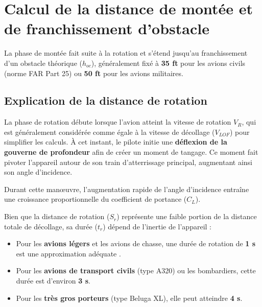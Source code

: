 			
 
 \vspace*{2cm}
 
 		\section{Calcul de la distance de montée et de franchissement d'obstacle}
 		
 		La phase de montée fait suite à la rotation et s'étend jusqu'au franchissement 
 		d'un obstacle théorique ($h_{oc}$), généralement fixé à \textbf{35 ft} pour les 
 		avions civils (norme FAR Part 25) ou \textbf{50 ft} pour les avions militaires.
 		
 		
\vspace*{1cm}

 		\subsection{Explication de la distance de rotation }
 		
 		La phase de rotation débute lorsque l'avion atteint la vitesse de rotation $ V_R$,
 		qui est généralement considérée comme égale à la vitesse de décollage ($V_{LOF}$) 
 		pour simplifier les calculs. À cet instant, le pilote initie une \textbf{déflexion
 		de la gouverne de profondeur} afin de créer un moment de tangage. Ce moment fait 
 		pivoter l'appareil autour de son train d'atterrissage principal, augmentant ainsi son angle d'incidence.
 		
 		Durant cette manœuvre, l'augmentation rapide de l'angle d'incidence entraîne une 
 		croissance proportionnelle du coefficient de portance ($C_L$). 
 		
 		Bien que la distance de rotation ($S_r$) représente une faible portion 
 		de la distance totale de décollage, sa durée ($t_r$) dépend de l'inertie de l'appareil :
 		\begin{itemize}
 			\item Pour les \textbf{avions légers} et les avions de chasse, une durée de rotation de \textbf{1 s} est une approximation adéquate .
 			\item Pour les \textbf{avions de transport civils} (type A320) ou les bombardiers, cette durée est d'environ \textbf{3 s}.
 			\item Pour les \textbf{très gros porteurs} (type Beluga XL), elle peut atteindre \textbf{4 s}.
 		\end{itemize}
 		
